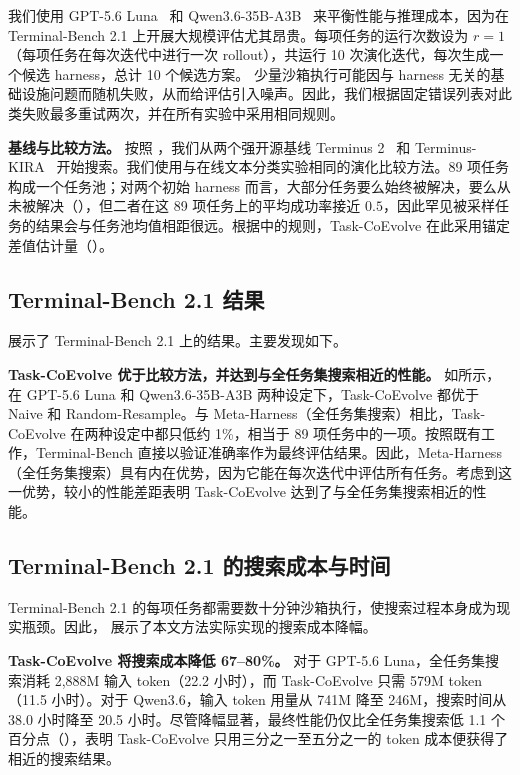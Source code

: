 \documentclass{article}
\begin{document}
我们使用 GPT-5.6 Luna~\citep{openai2026gpt56} 和 Qwen3.6-35B-A3B~\citep{qwen36_35b_a3b} 来平衡性能与推理成本，因为在 Terminal-Bench 2.1 上开展大规模评估尤其昂贵。每项任务的运行次数设为 $r=1$（每项任务在每次迭代中进行一次 rollout），共运行 10 次演化迭代，每次生成一个候选 harness，总计 10 个候选方案。
少量沙箱执行可能因与 harness 无关的基础设施问题而随机失败，从而给评估引入噪声。因此，我们根据固定错误列表对此类失败最多重试两次，并在所有实验中采用相同规则。

\textbf{基线与比较方法。}
按照 \citet{lee2026meta}，我们从两个强开源基线 Terminus 2~\citep{merrill2026terminal} 和 Terminus-KIRA~\citep{terminuskira2026} 开始搜索。我们使用与在线文本分类实验相同的演化比较方法。89 项任务构成一个任务池；对两个初始 harness 而言，大部分任务要么始终被解决，要么从未被解决（），但二者在这 89 项任务上的平均成功率接近 $0.5$，因此罕见被采样任务的结果会与任务池均值相距很远。根据中的规则，Task-CoEvolve 在此采用锚定差值估计量（）。

\subsection{Terminal-Bench 2.1 结果}
\label{subsec:result_terminal}


 展示了 Terminal-Bench 2.1 上的结果。主要发现如下。

\textbf{Task-CoEvolve 优于比较方法，并达到与全任务集搜索相近的性能。}
如所示，在 GPT-5.6 Luna 和 Qwen3.6-35B-A3B 两种设定下，Task-CoEvolve 都优于 Naive 和 Random-Resample。与 Meta-Harness（全任务集搜索）相比，Task-CoEvolve 在两种设定中都只低约 1\%，相当于 89 项任务中的一项。按照既有工作，Terminal-Bench 直接以验证准确率作为最终评估结果。因此，Meta-Harness（全任务集搜索）具有内在优势，因为它能在每次迭代中评估所有任务。考虑到这一优势，较小的性能差距表明 Task-CoEvolve 达到了与全任务集搜索相近的性能。

\subsection{Terminal-Bench 2.1 的搜索成本与时间}
\label{subsec:tb2-cost}

Terminal-Bench 2.1 的每项任务都需要数十分钟沙箱执行，使搜索过程本身成为现实瓶颈。因此， 展示了本文方法实际实现的搜索成本降幅。

\textbf{Task-CoEvolve 将搜索成本降低 67--80\%。}
对于 GPT-5.6 Luna，全任务集搜索消耗 2{,}888M 输入 token（22.2 小时），而 Task-CoEvolve 只需 579M token（11.5 小时）。对于 Qwen3.6，输入 token 用量从 741M 降至 246M，搜索时间从 38.0 小时降至 20.5 小时。尽管降幅显著，最终性能仍仅比全任务集搜索低 1.1 个百分点（），表明 Task-CoEvolve 只用三分之一至五分之一的 token 成本便获得了相近的搜索结果。
\end{document}

